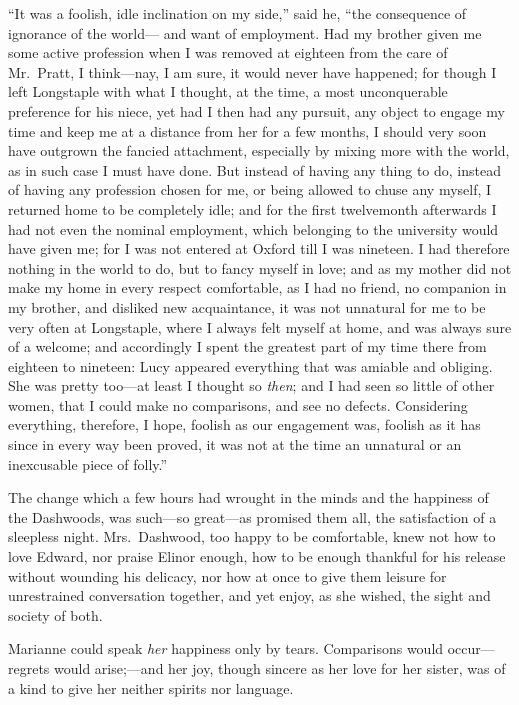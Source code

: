``It was a foolish, idle inclination on my side,''
said he, ``the consequence of ignorance of the world---%
and want of employment.  Had my brother given me
some active profession when I was removed at eighteen
from the care of Mr.\ Pratt, I think---nay, I am sure,
it would never have happened; for though I left Longstaple
with what I thought, at the time, a most unconquerable
preference for his niece, yet had I then had any pursuit,
any object to engage my time and keep me at a distance
from her for a few months, I should very soon have
outgrown the fancied attachment, especially by mixing
more with the world, as in such case I must have done.
But instead of having any thing to do, instead of having any
profession chosen for me, or being allowed to chuse any myself,
I returned home to be completely idle; and for the first
twelvemonth afterwards I had not even the nominal employment,
which belonging to the university would have given me;
for I was not entered at Oxford till I was nineteen.
I had therefore nothing in the world to do, but to fancy
myself in love; and as my mother did not make my home
in every respect comfortable, as I had no friend,
no companion in my brother, and disliked new acquaintance,
it was not unnatural for me to be very often at Longstaple,
where I always felt myself at home, and was always sure
of a welcome; and accordingly I spent the greatest part
of my time there from eighteen to nineteen: Lucy appeared
everything that was amiable and obliging.  She was pretty
too---at least I thought so \emph{then}; and I had seen so little
of other women, that I could make no comparisons, and see
no defects.  Considering everything, therefore, I hope,
foolish as our engagement was, foolish as it has since
in every way been proved, it was not at the time an unnatural
or an inexcusable piece of folly.''

The change which a few hours had wrought in the minds
and the happiness of the Dashwoods, was such---so great---as
promised them all, the satisfaction of a sleepless night.
Mrs.\ Dashwood, too happy to be comfortable, knew not how
to love Edward, nor praise Elinor enough, how to be enough
thankful for his release without wounding his delicacy,
nor how at once to give them leisure for unrestrained
conversation together, and yet enjoy, as she wished,
the sight and society of both.

Marianne could speak \emph{her} happiness only by tears.
Comparisons would occur---regrets would arise;---and her joy,
though sincere as her love for her sister, was of a kind to
give her neither spirits nor language.

